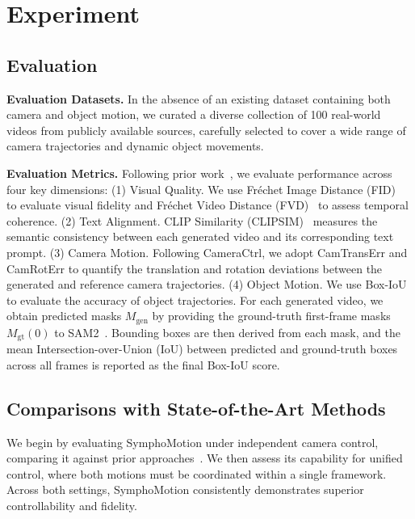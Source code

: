 \section{Experiment}
\subsection{Evaluation}

\noindent\textbf{Evaluation Datasets.}
In the absence of an existing dataset containing both camera and object motion, we curated a diverse collection of 100 real-world videos from publicly available sources, carefully selected to cover a wide range of camera trajectories and dynamic object movements.


\noindent\textbf{Evaluation Metrics.}
Following prior work~\cite{wang2024motionctrl, li2025magicmotion, fu20243dtrajmaster, shuai2025free}, we evaluate performance across four key dimensions:
(1) Visual Quality. We use Fréchet Image Distance (FID)~\cite{maximilian2020fid} to evaluate visual fidelity and Fréchet Video Distance (FVD)~\cite{unterthiner2018towards} to assess temporal coherence.
(2) Text Alignment. CLIP Similarity (CLIPSIM)~\cite{wu2021godiva} measures the semantic consistency between each generated video and its corresponding text prompt.
(3) Camera Motion. Following CameraCtrl, we adopt CamTransErr and CamRotErr to quantify the translation and rotation deviations between the generated and reference camera trajectories.
(4) Object Motion. We use Box-IoU to evaluate the accuracy of object trajectories. For each generated video, we obtain predicted masks $M_{\text{gen}}$ by providing the ground-truth first-frame masks $M_{\text{gt}}(0)$ to SAM2~\cite{ravi2024sam}. Bounding boxes are then derived from each mask, and the mean Intersection-over-Union (IoU) between predicted and ground-truth boxes across all frames is reported as the final Box-IoU score.

\subsection{Comparisons with State-of-the-Art Methods}
We begin by evaluating SymphoMotion under independent camera control, comparing it against prior approaches~\cite{he2024cameractrl,yu2024viewcrafter,cao2025uni3c}. We then assess its capability for unified control, where both motions must be coordinated within a single framework. Across both settings, SymphoMotion consistently demonstrates superior controllability and fidelity.

